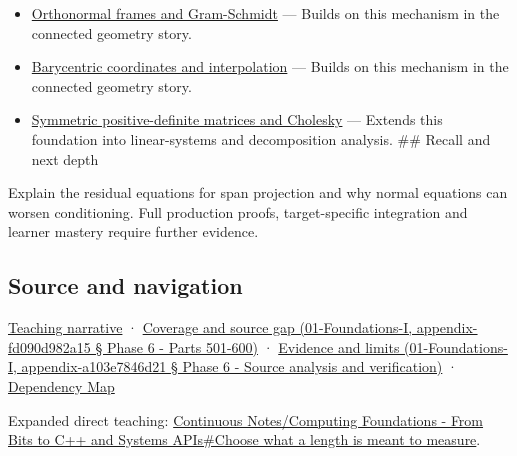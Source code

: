 \begin{itemize}
\tightlist
\item
  \hyperref[appendix-c39f1ed34271]{Orthonormal frames and Gram-Schmidt} --- Builds on this mechanism in the connected geometry story.
\item
  \hyperref[appendix-02b9d9a81dca]{Barycentric coordinates and interpolation} --- Builds on this mechanism in the connected geometry story.
\item
  \hyperref[appendix-50d2ea3c9b26]{Symmetric positive-definite matrices and Cholesky} --- Extends this foundation into linear-systems and decomposition analysis. \#\# Recall and next depth
\end{itemize}

Explain the residual equations for span projection and why normal equations can worsen conditioning. Full production proofs, target-specific integration and learner mastery require further evidence.

\subsection{Source and navigation}\label{source-and-navigation}

\href{Continuous\%20Notes/Computing\%20Foundations\%20-\%20From\%20Bits\%20to\%20C++\%20and\%20Systems\%20APIs\#A\%20Gram\%20matrix\%20remembers\%20the\%20geometry\%20of\%20a\%20slanted\%20basis}{Teaching narrative} · \href{}{Coverage and source gap (01-Foundations-I, appendix-fd090d982a15 § Phase 6 - Parts 501-600)} · \href{}{Evidence and limits (01-Foundations-I, appendix-a103e7846d21 § Phase 6 - Source analysis and verification)} · \hyperref[appendix-4ad47bdd269a]{Dependency Map}

Expanded direct teaching: \href{Continuous\%20Notes/Computing\%20Foundations\%20-\%20From\%20Bits\%20to\%20C++\%20and\%20Systems\%20APIs\#Choose\%20what\%20a\%20length\%20is\%20meant\%20to\%20measure}{Continuous Notes/Computing Foundations - From Bits to C++ and Systems APIs\#Choose what a length is meant to measure}.
